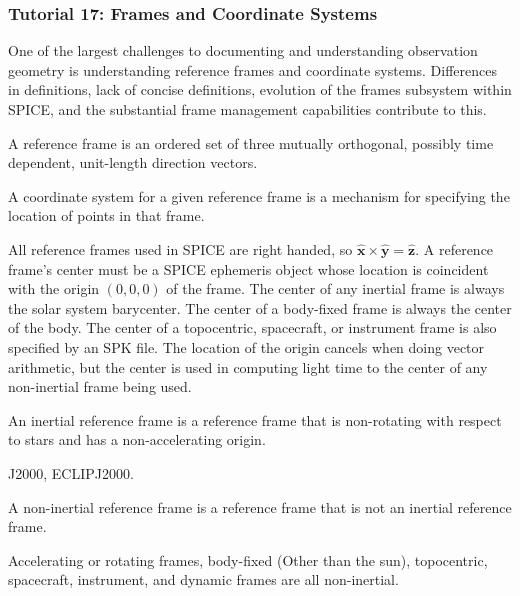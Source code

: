\documentclass[crop=false,class=book]{standalone}
\begin{document}
            \subsubsection{Tutorial 17: Frames and Coordinate Systems}
            One of the largest challenges to documenting and understanding observation geometry is understanding reference frames and coordinate systems. Differences in definitions, lack of concise definitions, evolution of the frames subsystem within SPICE, and the substantial frame management capabilities contribute to this. 
            \begin{definition}
            A reference frame is an ordered set of three mutually orthogonal, possibly time dependent, unit-length direction vectors.
            \end{definition}
            \begin{definition}
            A coordinate system for a given reference frame is a mechanism for specifying the location of points in that frame.
            \end{definition}
            All reference frames used in SPICE are right handed, so $\hat{\mathbf{x}}\times \hat{\mathbf{y}} = \hat{\mathbf{z}}$. A reference frame's center must be a SPICE ephemeris object whose location is coincident with the origin $(0,0,0)$ of the frame. The center of any inertial frame is always the solar system barycenter. The center of a body-fixed frame is always the center of the body. The center of a topocentric, spacecraft, or instrument frame is also specified by an SPK file. The location of the origin cancels when doing vector arithmetic, but the center is used in computing light time to the center of any non-inertial frame being used.
            \begin{definition}
            An inertial reference frame is a reference frame that is non-rotating with respect to stars and has a non-accelerating origin.
            \end{definition}
            \begin{example}
            J2000, ECLIPJ2000.
            \end{example}
            \begin{definition}
            A non-inertial reference frame is a reference frame that is not an inertial reference frame.
            \end{definition}
            \begin{example}
            Accelerating or rotating frames, body-fixed (Other than the sun), topocentric, spacecraft, instrument, and dynamic frames are all non-inertial. 
            \end{example}
\end{document}
